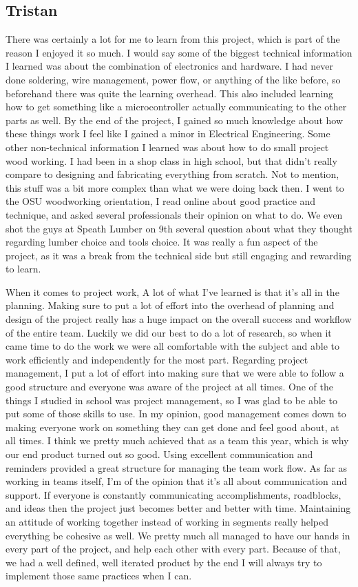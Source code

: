 \documentclass[onecolumn, draftclsnofoot,10pt, compsoc]{IEEEtran}
\begin{document}
\subsection{Tristan}
There was certainly a lot for me to learn from this project, which is part of the reason I enjoyed it so much.
I would say some of the biggest technical information I learned was about the combination of electronics and hardware.
I had never done soldering, wire management, power flow, or anything of the like before, so beforehand there was quite the learning overhead.
This also included learning how to get something like a microcontroller actually communicating to the other parts as well.
By the end of the project, I gained so much knowledge about how these things work I feel like I gained a minor in Electrical Engineering.
Some other non-technical information I learned was about how to do small project wood working.
I had been in a shop class in high school, but that didn't really compare to designing and fabricating everything from scratch.
Not to mention, this stuff was a bit more complex than what we were doing back then.
I went to the OSU woodworking orientation, I read online about good practice and technique, and asked several professionals their opinion on what to do.
We even shot the guys at Speath Lumber on 9th several question about what they thought regarding lumber choice and tools choice.
It was really a fun aspect of the project, as it was a break from the technical side but still engaging and rewarding to learn.

When it comes to project work, A lot of what I've learned is that it's all in the planning.
Making sure to put a lot of effort into the overhead of planning and design of the project really has a huge impact on the overall success and workflow of the entire team.
Luckily we did our best to do a lot of research, so when it came time to do the work we were all comfortable with the subject and able to work efficiently and independently for the most part.
Regarding project management, I put a lot of effort into making sure that we were able to follow a good structure and everyone was aware of the project at all times.
One of the things I studied in school was project management, so I was glad to be able to put some of those skills to use.
In my opinion, good management comes down to making everyone work on something they can get done and feel good about, at all times.
I think we pretty much achieved that as a team this year, which is why our end product turned out so good.
Using excellent communication and reminders provided a great structure for managing the team work flow.
As far as working in teams itself, I'm of the opinion that it's all about communication and support.
If everyone is constantly communicating accomplishments, roadblocks, and ideas then the project just becomes better and better with time.
Maintaining an attitude of working together instead of working in segments really helped everything be cohesive as well.
We pretty much all managed to have our hands in every part of the project, and help each other with every part.
Because of that, we had a well defined, well iterated product by the end I will always try to implement those same practices when I can.
\end{document}
